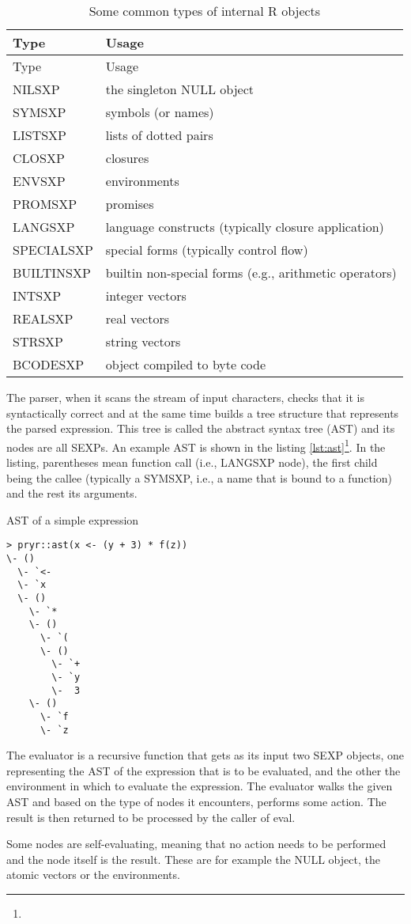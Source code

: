 \begin{longtable}[c]{@{}ll@{}}
\caption{Some common types of internal R objects\label{tab:sexp-types}} \tabularnewline
\toprule
Type & Usage \tabularnewline
\midrule
\endfirsthead
\toprule
Type & Usage \tabularnewline
\midrule
\endhead
NILSXP & the singleton NULL object \tabularnewline
SYMSXP & symbols (or names) \tabularnewline
LISTSXP & lists of dotted pairs \tabularnewline
CLOSXP & closures \tabularnewline
ENVSXP & environments \tabularnewline
PROMSXP & promises \tabularnewline
LANGSXP & language constructs (typically closure application) \tabularnewline
SPECIALSXP & special forms (typically control flow)\tabularnewline
BUILTINSXP & builtin non-special forms (e.g., arithmetic operators) \tabularnewline
INTSXP & integer vectors \tabularnewline
REALSXP & real vectors \tabularnewline
STRSXP & string vectors \tabularnewline
BCODESXP & object compiled to byte code \tabularnewline
\bottomrule
\end{longtable}

The parser, when it scans the stream of input characters, checks that it is syntactically correct and at the same time builds a tree structure that represents the parsed expression. This tree is called the abstract syntax tree (AST) and its nodes are all SEXPs. An example AST is shown in the listing \ref{lst:ast}\footnote{}. In the listing, parentheses mean function call (i.e., LANGSXP node), the first child being the callee (typically a SYMSXP, i.e., a name that is bound to a function) and the rest its arguments.

\begin{listing}[htbp]
  \caption{\label{lst:ast}AST of a simple expression}
  \begin{verbatim}
> pryr::ast(x <- (y + 3) * f(z))
\- ()
  \- `<-
  \- `x
  \- ()
    \- `*
    \- ()
      \- `(
      \- ()
        \- `+
        \- `y
        \-  3
    \- ()
      \- `f
      \- `z
  \end{verbatim}
\end{listing}

The evaluator is a recursive function that gets as its input two SEXP objects, one representing the AST of the expression that is to be evaluated, and the other the environment in which to evaluate the expression. The evaluator walks the given AST and based on the type of nodes it encounters, performs some action. The result is then returned to be processed by the caller of eval.

Some nodes are self-evaluating, meaning that no action needs to be performed and the node itself is the result. These are for example the NULL object, the atomic vectors or the environments.

